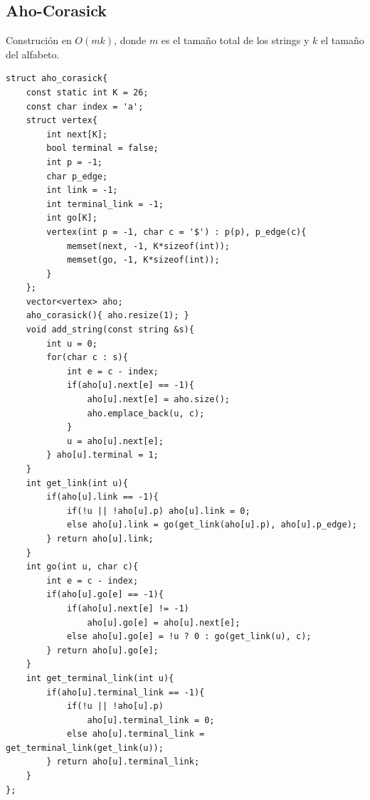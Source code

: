 \documentclass[10pt,spanish,mexico]{article}
\numberwithin{equation}{section}
\begin{document}
\begin{multicols}{2}
\vspace{-1.2\baselineskip}
\hrulefill
\subsection{Aho-Corasick}
Construción en $O(mk)$, donde $m$ es el tamaño total de los strings y $k$ el tamaño del alfabeto.
\begin{verbatim}
struct aho_corasick{
    const static int K = 26;
    const char index = 'a';
    struct vertex{
        int next[K];
        bool terminal = false;
        int p = -1;
        char p_edge;
        int link = -1;
        int terminal_link = -1;
        int go[K];
        vertex(int p = -1, char c = '$') : p(p), p_edge(c){
            memset(next, -1, K*sizeof(int));
            memset(go, -1, K*sizeof(int));
        }
    };
    vector<vertex> aho;
    aho_corasick(){ aho.resize(1); }
    void add_string(const string &s){
        int u = 0;
        for(char c : s){
            int e = c - index;
            if(aho[u].next[e] == -1){
                aho[u].next[e] = aho.size();
                aho.emplace_back(u, c);
            }
            u = aho[u].next[e];
        } aho[u].terminal = 1;
    }
    int get_link(int u){
        if(aho[u].link == -1){
            if(!u || !aho[u].p) aho[u].link = 0;
            else aho[u].link = go(get_link(aho[u].p), aho[u].p_edge);
        } return aho[u].link;
    }
    int go(int u, char c){
        int e = c - index;
        if(aho[u].go[e] == -1){
            if(aho[u].next[e] != -1)
                aho[u].go[e] = aho[u].next[e];
            else aho[u].go[e] = !u ? 0 : go(get_link(u), c);
        } return aho[u].go[e];
    }
    int get_terminal_link(int u){
        if(aho[u].terminal_link == -1){
            if(!u || !aho[u].p)
                aho[u].terminal_link = 0;
            else aho[u].terminal_link = get_terminal_link(get_link(u));
        } return aho[u].terminal_link;
    }
};
\end{verbatim}

\vspace{-1.2\baselineskip}
\hrulefill

\end{multicols}
\end{document}
